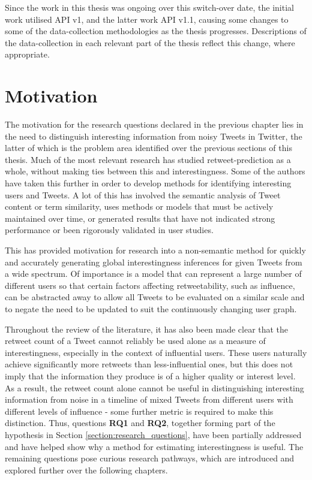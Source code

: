 Since the work in this thesis was ongoing over this switch-over date, the initial work utilised API v1, and the latter work API v1.1, causing some changes to some of the data-collection methodologies as the thesis progresses. Descriptions of the data-collection in each relevant part of the thesis reflect this change, where appropriate.


\section{Motivation}
The motivation for the research questions declared in the previous chapter lies in the need to distinguish interesting information from noisy Tweets in Twitter, the latter of which is the problem area identified over the previous sections of this thesis. Much of the most relevant research has studied retweet-prediction as a whole, without making ties between this and interestingness. Some of the authors have taken this further in order to develop methods for identifying interesting users and Tweets. A lot of this has involved the semantic analysis of Tweet content or term similarity, uses methods or models that must be actively maintained over time, or generated results that have not indicated strong performance or been rigorously validated in user studies.

This has provided motivation for research into a non-semantic method for quickly and accurately generating global interestingness inferences for given Tweets from a wide spectrum. Of importance is a model that can represent a large number of different users so that certain factors affecting retweetability, such as influence, can be abstracted away to allow all Tweets to be evaluated on a similar scale and to negate the need to be updated to suit the continuously changing user graph.

Throughout the review of the literature, it has also been made clear that the retweet count of a Tweet cannot reliably be used alone as a measure of interestingness, especially in the context of influential users. These users naturally achieve significantly more retweets than less-influential ones, but this does not imply that the information they produce is of a higher quality or interest level. As a result, the retweet count alone cannot be useful in distinguishing interesting information from noise in a timeline of mixed Tweets from different users with different levels of influence - some further metric is required to make this distinction. Thus, questions \textbf{RQ1} and \textbf{RQ2}, together forming part of the hypothesis in Section \ref{section:research_questions}, have been partially addressed and have helped show why a method for estimating interestingness is useful. The remaining questions pose curious research pathways, which are introduced and explored further over the following chapters.


